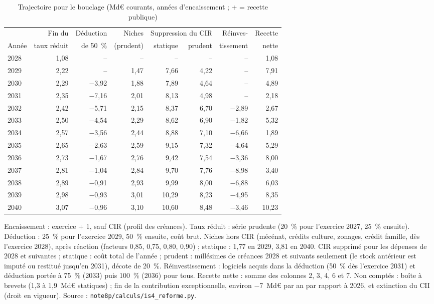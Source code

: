 \begin{table}[!htbp]\centering\scriptsize
\caption{Trajectoire pour le bouclage (Md€ courants, années d'encaissement ; + = recette publique)}\label{tab:is8_annuel}
\setlength{\tabcolsep}{3.2pt}
\begin{tabular}{@{}lrrrrrrr@{}}
\toprule
& Fin du & Déduction & Niches & \multicolumn{2}{c}{Suppression du CIR} & Réinves- & Recette \\
\cmidrule(lr){5-6}
Année & taux réduit & de 50~\% & (prudent) & statique & prudent & tissement & nette \\
\midrule
2028 & 1,08 & -- & -- & -- & -- & -- & 1,08 \\
2029 & 2,22 & -- & 1,47 & 7,66 & 4,22 & -- & 7,91 \\
2030 & 2,29 & $-$3,92 & 1,88 & 7,89 & 4,64 & -- & 4,89 \\
2031 & 2,35 & $-$7,16 & 2,01 & 8,13 & 4,98 & -- & 2,18 \\
2032 & 2,42 & $-$5,71 & 2,15 & 8,37 & 6,70 & $-$2,89 & 2,67 \\
2033 & 2,50 & $-$4,54 & 2,29 & 8,62 & 6,90 & $-$1,82 & 5,32 \\
2034 & 2,57 & $-$3,56 & 2,44 & 8,88 & 7,10 & $-$6,66 & 1,89 \\
2035 & 2,65 & $-$2,63 & 2,59 & 9,15 & 7,32 & $-$4,64 & 5,29 \\
2036 & 2,73 & $-$1,67 & 2,76 & 9,42 & 7,54 & $-$3,36 & 8,00 \\
2037 & 2,81 & $-$1,04 & 2,84 & 9,70 & 7,76 & $-$8,98 & 3,40 \\
2038 & 2,89 & $-$0,91 & 2,93 & 9,99 & 8,00 & $-$6,88 & 6,03 \\
2039 & 2,98 & $-$0,93 & 3,01 & 10,29 & 8,23 & $-$4,95 & 8,35 \\
2040 & 3,07 & $-$0,96 & 3,10 & 10,60 & 8,48 & $-$3,46 & 10,23 \\
\bottomrule
\end{tabular}
\par\vspace{3pt}\parbox{\linewidth}{\raggedright\scriptsize Encaissement : exercice + 1, sauf CIR (profil des créances).
Taux réduit : série prudente (20~\% pour l'exercice 2027, 25~\% ensuite). Déduction : 25~\% pour l'exercice 2029, 50~\%
ensuite, coût brut. Niches hors CIR (mécénat, crédits culture, zonages, crédit famille, dès l'exercice 2028), après
réaction (facteurs 0,85, 0,75, 0,80, 0,90) ; statique : 1,77 en 2029, 3,81 en 2040. CIR supprimé pour les dépenses de 2028
et suivantes ; statique : coût total de l'année ; prudent : millésimes de créances 2028 et suivants seulement (le stock
antérieur est imputé ou restitué jusqu'en 2031), décote de 20~\%. Réinvestissement : logiciels acquis dans la déduction
(50~\% dès l'exercice 2031) et déduction portée à 75~\% (2033) puis 100~\% (2036) pour tous. Recette nette : somme des
colonnes 2, 3, 4, 6 et 7. Non comptés : boîte à brevets (1,3 à 1,9~Md€ statiques) ; fin de la contribution exceptionnelle,
environ $-$7~Md€ par an par rapport à 2026, et extinction du CII (droit en vigueur). Source :
\texttt{note8p/calculs/is4\_reforme.py}.}
\end{table}

